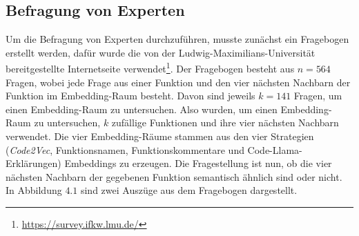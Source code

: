 \documentclass[12pt,letterpaper,ngerman]{article}
\begin{document}
\subsection{Befragung von Experten}
Um die Befragung von Experten durchzuführen, musste zunächst ein
Fragebogen erstellt werden, dafür wurde die von der 
Ludwig-Maximilians-Universität bereitgestellte Internetseite
verwendet\footnote{\url{https://survey.ifkw.lmu.de/}}. Der 
Fragebogen besteht aus $n=564 $ Fragen, wobei jede Frage aus
einer Funktion und den vier nächsten Nachbarn der Funktion im
Embedding-Raum besteht. Davon sind jeweils $k = 141$ Fragen, um
einen Embedding-Raum zu untersuchen. Also wurden, um einen
Embedding-Raum zu untersuchen, $k$ zufällige Funktionen und ihre
vier nächsten Nachbarn verwendet. Die vier Embedding-Räume
stammen aus den vier Strategien (\textit{Code2Vec}, Funktionsnamen,
Funktionskommentare und Code-Llama-Erklärungen) Embeddings zu 
erzeugen. Die Fragestellung ist nun, ob die vier nächsten Nachbarn 
der gegebenen Funktion semantisch ähnlich sind oder nicht.
In Abbildung $4.1$ sind zwei Auszüge aus dem Fragebogen dargestellt.
\end{document}
